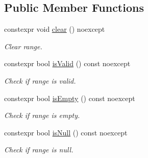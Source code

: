 \subsection*{Public Member Functions}
\begin{DoxyCompactItemize}
\item 
constexpr void \hyperlink{class_mdt_1_1_item_model_1_1_range_aa1d8c1640b75bfaa2f2b412656336031}{clear} () noexcept\hypertarget{class_mdt_1_1_item_model_1_1_range_aa1d8c1640b75bfaa2f2b412656336031}{}\label{class_mdt_1_1_item_model_1_1_range_aa1d8c1640b75bfaa2f2b412656336031}

\begin{DoxyCompactList}\small\item\em Clear range. \end{DoxyCompactList}\item 
constexpr bool \hyperlink{class_mdt_1_1_item_model_1_1_range_ae43b1a366842818a67e30a48c22cfa89}{is\+Valid} () const noexcept
\begin{DoxyCompactList}\small\item\em Check if range is valid. \end{DoxyCompactList}\item 
constexpr bool \hyperlink{class_mdt_1_1_item_model_1_1_range_a20a3a1200c350b9558cc12f083343618}{is\+Empty} () const noexcept\hypertarget{class_mdt_1_1_item_model_1_1_range_a20a3a1200c350b9558cc12f083343618}{}\label{class_mdt_1_1_item_model_1_1_range_a20a3a1200c350b9558cc12f083343618}

\begin{DoxyCompactList}\small\item\em Check if range is empty. \end{DoxyCompactList}\item 
constexpr bool \hyperlink{class_mdt_1_1_item_model_1_1_range_a9af1bd0b5a1a8009509d81fb6ad12068}{is\+Null} () const noexcept
\begin{DoxyCompactList}\small\item\em Check if range is null. \end{DoxyCompactList}\end{DoxyCompactItemize}
